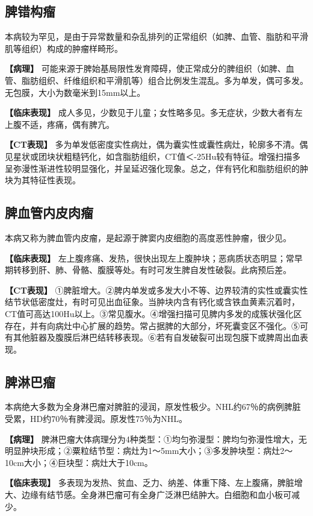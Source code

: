 \subsection{脾错构瘤}

本病较为罕见，是由于异常数量和杂乱排列的正常组织（如脾、血管、脂肪和平滑肌等组织）构成的肿瘤样畸形。

\textbf{【病理】}
可能来源于脾始基局限性发育障碍，使正常成分的脾组织（如脾、血管、脂肪组织、纤维组织和平滑肌等）组合比例发生混乱。多为单发，偶可多发。无包膜，大小为数毫米到15mm以上。

\textbf{【临床表现】}
成人多见，少数见于儿童；女性略多见。多无症状，少数大者有左上腹不适，疼痛，偶有脾亢。

\textbf{【CT表现】}
多为单发低密度实性病灶，偶为囊实性或囊性病灶，轮廓多不清。偶见星状或团块状粗糙钙化，如含脂肪组织，CT值＜-25Hu较有特征。增强扫描多呈弥漫性渐进性较明显强化，并呈延迟强化现象。总之，伴有钙化和脂肪组织的肿块为其特征性表现。

\subsection{脾血管内皮肉瘤}

本病又称为脾血管内皮瘤，是起源于脾窦内皮细胞的高度恶性肿瘤，很少见。

\textbf{【临床表现】}
左上腹疼痛、发热，很快出现左上腹肿块；恶病质状态明显；常早期转移到肝、肺、骨骼、腹膜等处。有时可发生脾自发性破裂。此病预后差。

\textbf{【CT表现】}
①脾脏增大。②脾内单发或多发大小不等、边界较清的实性或囊实性结节状低密度灶，有时可见出血征象。当肿块内含有钙化或含铁血黄素沉着时，CT值可高达100Hu以上。③常见腹水。④增强扫描可见脾内多发的成簇状强化区存在，并有向病灶中心扩展的趋势。常占据脾的大部分，坏死囊变区不强化。⑤可有其他脏器及腹膜后淋巴结转移表现。⑥若有自发破裂可出现包膜下或脾周出血表现。

\subsection{脾淋巴瘤}

本病绝大多数为全身淋巴瘤对脾脏的浸润，原发性极少。NHL约67％的病例脾脏受累，HD约70％有脾浸润。原发性75％为NHL。

\textbf{【病理】}
脾淋巴瘤大体病理分为4种类型：①均匀弥漫型：脾均匀弥漫性增大，无明显肿块形成；②粟粒结节型：病灶为1～5mm大小；③多发肿块型：病灶2～10cm大小；④巨块型：病灶大于10cm。

\textbf{【临床表现】}
多表现为发热、贫血、乏力、纳差、体重下降、左上腹痛，脾脏增大、边缘有结节感。全身淋巴瘤可有全身广泛淋巴结肿大。白细胞和血小板可减少。

